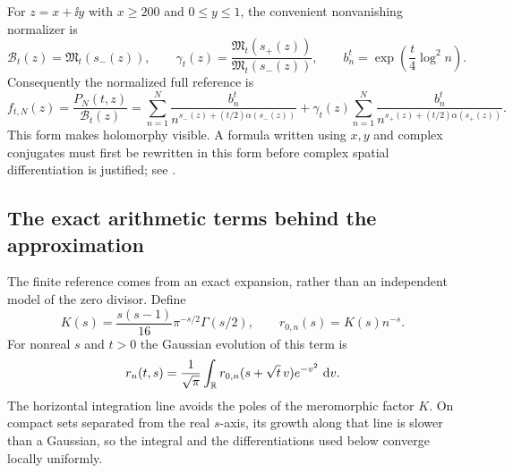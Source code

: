 For $z=x+\ii y$ with $x\ge200$ and $0\le y\le1$, the convenient
nonvanishing normalizer is
\begin{equation}
 \mathcal B_t(z)=\mathfrak M_t(s_-(z)),\qquad
 \gamma_t(z)=\frac{\mathfrak M_t(s_+(z))}
                  {\mathfrak M_t(s_-(z))},\qquad
 b_n^t=\exp\left(\frac{t}{4}\log^2 n\right).
 \label{as:normalizer}
\end{equation}
Consequently the normalized full reference is
\begin{equation}
 f_{t,N}(z)=\frac{P_N(t,z)}{\mathcal B_t(z)}
   =\sum_{n=1}^N\frac{b_n^t}{n^{s_-(z)+(t/2)\alpha(s_-(z))}}
    +\gamma_t(z)\sum_{n=1}^N
       \frac{b_n^t}{n^{s_+(z)+(t/2)\alpha(s_+(z))}}.
 \label{as:full-f}
\end{equation}
This form makes holomorphy visible.  A formula written using $x,y$ and
complex conjugates must first be rewritten in this form before complex
spatial differentiation is justified; see \cite[\S8, (92)]{Polymath2019}.

\subsection{The exact arithmetic terms behind the approximation}

The finite reference comes from an exact expansion, rather than an
independent model of the zero divisor.  Define
\begin{equation}
 K(s)=\frac{s(s-1)}{16}\pi^{-s/2}\Gamma(s/2),\qquad
 r_{0,n}(s)=K(s)n^{-s}.
 \label{as:exact-initial-term}
\end{equation}
For nonreal $s$ and $t>0$ the Gaussian evolution of this term is
\begin{equation}
 r_n(t,s)=\frac1{\sqrt\pi}\int_{\mathbb R}
          r_{0,n}(s+\sqrt t\,v)e^{-v^2}\,\,\mathrm d v.
 \label{as:exact-term}
\end{equation}
The horizontal integration line avoids the poles of the meromorphic
factor $K$.  On compact sets separated from the real $s$-axis, its
growth along that line is slower than a Gaussian, so the integral and
the differentiations used below converge locally uniformly.

